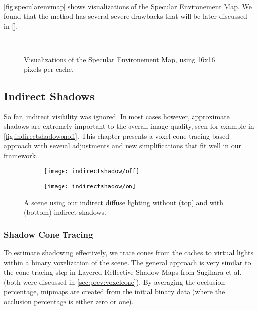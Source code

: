 \documentclass[thesis.tex]{subfiles}
\begin{document}
\\
\autoref{fig:specularenvmap} shows visualizations of the Specular Environement Map.
We found that the method has several severe drawbacks that will be later discussed in \autoref{}. 
\begin{figure}[h!]
\centering
{}
\\
\caption{Visualizations of the Specular Environement Map, using 16x16 pixels per cache.}
\label{fig:specularenvmap}
\end{figure}

\subsection{Indirect Shadows}
So far, indirect visibility was ignored.
In most cases however, approximate shadows are extremely important to the overall image quality, seen for example in \autoref{fig:indirectshadowonoff}.
This chapter presents a voxel cone tracing based approach with several adjustments and new simplifications that fit well in our framework.
\begin{figure}[h!]
\centering
\begin{subfigure}[b]{\textwidth}
	\texttt{[image: indirectshadow/off]}
\end{subfigure}

\vspace{8pt}
\begin{subfigure}[b]{\textwidth}
	\texttt{[image: indirectshadow/on]}
\end{subfigure}
\caption{A scene using our indirect diffuse lighting without (top) and with (bottom) indirect shadows.}
\label{fig:indirectshadowonoff}
\end{figure}

\subsubsection{Shadow Cone Tracing}\label{sec:impl:voxelization}
To estimate shadowing effectively, we trace cones from the caches to virtual lights within a binary voxelization of the scene.
The general approach is very similar to the cone tracing step in \cite{bib:layeredrsm} Layered Reflective Shadow Maps from Sugihara et al. \cite{bib:layeredrsm} (both were discussed in \autoref{sec:prev:voxelcone}).
By averaging the occlusion percentage, mipmaps are created from the initial binary data (where the occlusion percentage is either zero or one).
\end{document}
